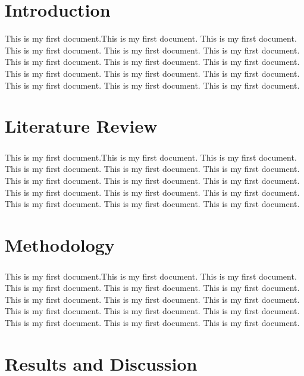 \documentclass{report}
\begin{document}
	\tableofcontents
	
	\chapter{Introduction}
	\setcounter{page}{1}
	
	This is my first document.This is my first document. This is my first document. This is my first document. This is my first document. This is my first document. This is my first document. This is my first document. This is my first document. This is my first document. This is my first document. This is my first document. This is my first document. This is my first document. This is my first document.
	
	\chapter{Literature Review}
	\paragraph{}
	
	This is my first document.This is my first document. This is my first document. This is my first document. This is my first document. This is my first document. This is my first document. This is my first document. This is my first document. This is my first document. This is my first document. This is my first document. This is my first document. This is my first document. This is my first document.
	
	
	\chapter{Methodology}
	\paragraph{}
	
	This is my first document.This is my first document. This is my first document. This is my first document. This is my first document. This is my first document. This is my first document. This is my first document. This is my first document. This is my first document. This is my first document. This is my first document. This is my first document. This is my first document. This is my first document.
	
	\chapter{Results and Discussion}
\end{document}
